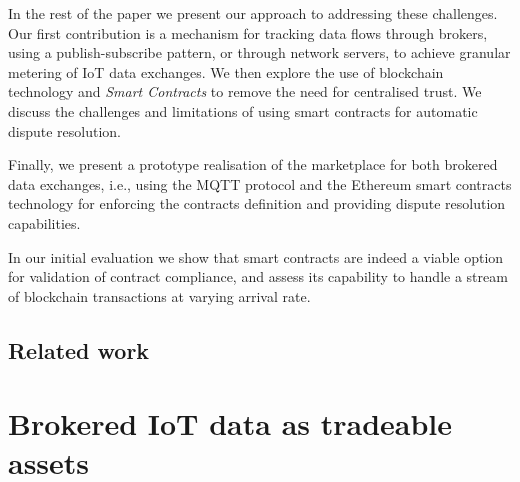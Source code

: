 \documentclass[conference]{IEEEtran}
\begin{document}
In the rest of the paper we present our approach to addressing these challenges.
Our first contribution is a mechanism for tracking data flows through brokers, using a publish-subscribe pattern, or through network servers, to achieve granular metering of IoT data exchanges.
We then explore the use of blockchain technology and \textit{Smart Contracts} \cite{SMART-CONTRACTS} to remove the need for centralised trust. We discuss the challenges and limitations of using smart contracts for automatic dispute resolution.

Finally, we present a prototype realisation of the marketplace for both brokered data exchanges, i.e., using the MQTT protocol and the Ethereum smart contracts technology for enforcing the contracts definition and providing dispute resolution capabilities.

In our initial evaluation we show that smart contracts are indeed a viable option for validation of contract compliance, and assess its capability to handle a stream of blockchain transactions at varying arrival rate.

\subsection{Related work}


\section{Brokered IoT data as tradeable assets}
\end{document}
